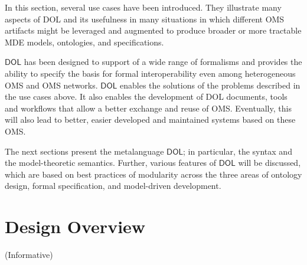 \documentclass[10pt,fleqn,final]{scrreprt}
\newcommand*{\DOL}{\ensuremath{\mathsf{DOL}}\xspace}
\newcommand{\informative}[0]{{\begin{center}{\Large{(Informative})}\end{center}} \bigskip}
\newcommand{\clauseI}[1]{\chapter{#1} \informative }
\newenvironment{definitions}[0]{\medskip }{}
\begin{document}
\begin{definitions}
In this section, several use cases have been introduced. They illustrate many aspects of DOL and its usefulness in many situations in which different OMS artifacts might be leveraged and augmented to produce broader or more tractable MDE models, ontologies, and specifications.

 \DOL has been designed to support of a wide range of formalisms and
provides the ability to specify the basis for formal interoperability even among heterogeneous OMS and OMS networks. \DOL enables the solutions of the problems described in the use cases above. It also enables the development of DOL documents, tools and workflows that 
allow  a better exchange and reuse of OMS. Eventually, this will also lead to better, easier developed and maintained systems based on these OMS.

The next sections present the metalanguage \DOL{}; in particular, the syntax and the model-theoretic semantics. Further, various features of \DOL will be discussed, which  are based on  best practices of modularity  across
 the three areas of ontology design, formal 
specification, and model-driven development.




\clauseI{Design Overview} \label{c:design}


\end{definitions}
\end{document}
